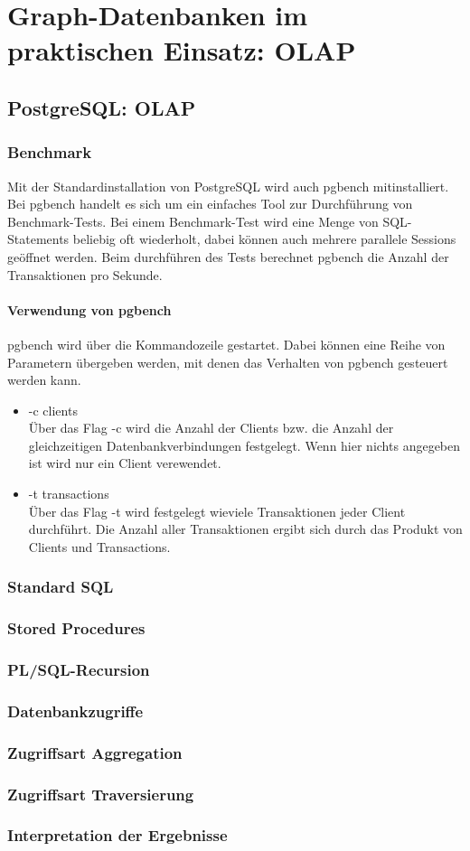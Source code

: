 \chapter{Graph-Datenbanken im praktischen Einsatz: OLAP}
\section{PostgreSQL: OLAP}
\subsection{Benchmark}
Mit der Standardinstallation von PostgreSQL wird auch pgbench mitinstalliert. Bei pgbench handelt es sich um ein einfaches Tool zur Durchführung von Benchmark-Tests. Bei einem Benchmark-Test wird eine Menge von SQL-Statements beliebig oft wiederholt, dabei können auch mehrere parallele Sessions geöffnet werden. Beim durchführen des Tests berechnet pgbench die Anzahl der Transaktionen pro Sekunde.
\subsubsection{Verwendung von pgbench}
pgbench wird über die Kommandozeile gestartet. Dabei können eine Reihe von Parametern übergeben werden, mit denen das Verhalten von pgbench gesteuert werden kann.
\begin{itemize}
	\item -c clients  \\
	Über das Flag -c wird die Anzahl der Clients bzw. die Anzahl der gleichzeitigen Datenbankverbindungen festgelegt. Wenn hier nichts angegeben ist wird nur ein Client verewendet.
	\item -t transactions \\
	Über das Flag -t wird festgelegt wieviele Transaktionen jeder Client durchführt. Die Anzahl aller Transaktionen ergibt sich durch das Produkt von Clients und Transactions.
\end{itemize}
\subsection{Standard SQL}
\subsection{Stored Procedures}
\subsection{PL/SQL-Recursion}
\subsection{Datenbankzugriffe}
\subsection{Zugriffsart Aggregation}
\subsection{Zugriffsart Traversierung}
\subsection{Interpretation der Ergebnisse}